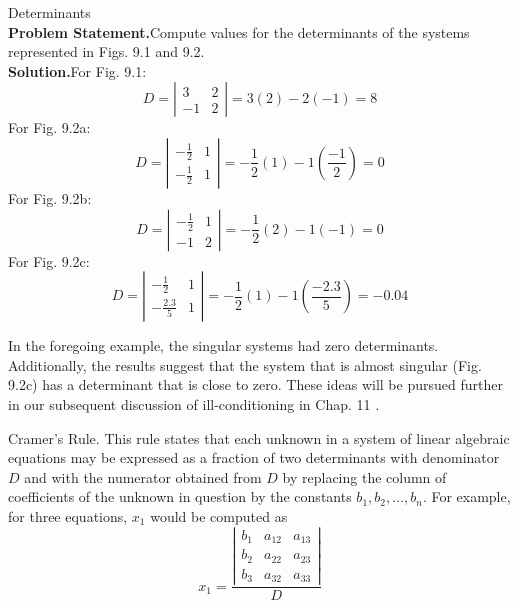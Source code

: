 \documentclass[../main.tex]{subfiles}
\begin{document}
\begin{example} Determinants\\

    \noindent\textbf{Problem Statement.}\quad Compute values for the determinants of the systems represented in Figs. 9.1 and 9.2.\\

    \noindent\textbf{Solution.}\quad For Fig. 9.1:\\

    $$
    D=\left|\begin{array}{rr}
    3 & 2 \\
    -1 & 2
    \end{array}\right|=3(2)-2(-1)=8
    $$
    For Fig. 9.2a:
    $$
    D=\left|\begin{array}{ll}
    -\frac{1}{2} & 1 \\
    -\frac{1}{2} & 1
    \end{array}\right|=-\frac{1}{2}(1)-1\left(\frac{-1}{2}\right)=0
    $$
    For Fig. 9.2b:
    $$
    D=\left|\begin{array}{rr}
    -\frac{1}{2} & 1 \\
    -1 & 2
    \end{array}\right|=-\frac{1}{2}(2)-1(-1)=0
    $$
    For Fig. 9.2c:
    $$
    D=\left|\begin{array}{cc}
    -\frac{1}{2} & 1 \\
    -\frac{2.3}{5} & 1
    \end{array}\right|=-\frac{1}{2}(1)-1\left(\frac{-2.3}{5}\right)=-0.04
    $$

\end{example}

In the foregoing example, the singular systems had zero determinants. Additionally, the results suggest that the system that is almost singular (Fig. 9.2c) has a determinant that is close to zero. These ideas will be pursued further in our subsequent discussion of ill-conditioning in Chap. 11 .

Cramer's Rule. This rule states that each unknown in a system of linear algebraic equations may be expressed as a fraction of two determinants with denominator $D$ and with the numerator obtained from $D$ by replacing the column of coefficients of the unknown in question by the constants $b_{1}, b_{2}, \ldots, b_{n}$. For example, for three equations, $x_{1}$ would be computed as
$$
x_{1}=\frac{\left|\begin{array}{lll}
b_{1} & a_{12} & a_{13} \\
b_{2} & a_{22} & a_{23} \\
b_{3} & a_{32} & a_{33}
\end{array}\right|}{D}
$$
\end{document}
